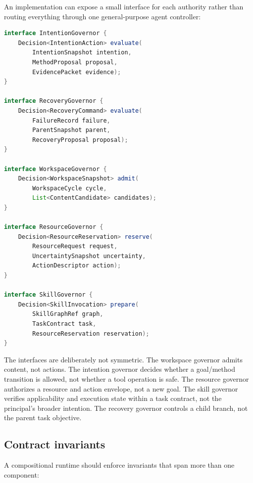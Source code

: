 An implementation can expose a small interface for each authority rather than routing everything through one general-purpose agent controller:

\begin{lstlisting}[language=Java,caption={Illustrative composition ports}]
interface IntentionGovernor {
    Decision<IntentionAction> evaluate(
        IntentionSnapshot intention,
        MethodProposal proposal,
        EvidencePacket evidence);
}

interface RecoveryGovernor {
    Decision<RecoveryCommand> evaluate(
        FailureRecord failure,
        ParentSnapshot parent,
        RecoveryProposal proposal);
}

interface WorkspaceGovernor {
    Decision<WorkspaceSnapshot> admit(
        WorkspaceCycle cycle,
        List<ContentCandidate> candidates);
}

interface ResourceGovernor {
    Decision<ResourceReservation> reserve(
        ResourceRequest request,
        UncertaintySnapshot uncertainty,
        ActionDescriptor action);
}

interface SkillGovernor {
    Decision<SkillInvocation> prepare(
        SkillGraphRef graph,
        TaskContract task,
        ResourceReservation reservation);
}
\end{lstlisting}

The interfaces are deliberately not symmetric. The workspace governor admits content, not actions. The intention governor decides whether a goal/method transition is allowed, not whether a tool operation is safe. The resource governor authorizes a resource and action envelope, not a new goal. The skill governor verifies applicability and execution state within a task contract, not the principal's broader intention. The recovery governor controls a child branch, not the parent task objective.

\subsection{Contract invariants}
\label{subsec:ch18-contract-invariants}

A compositional runtime should enforce invariants that span more than one component:

